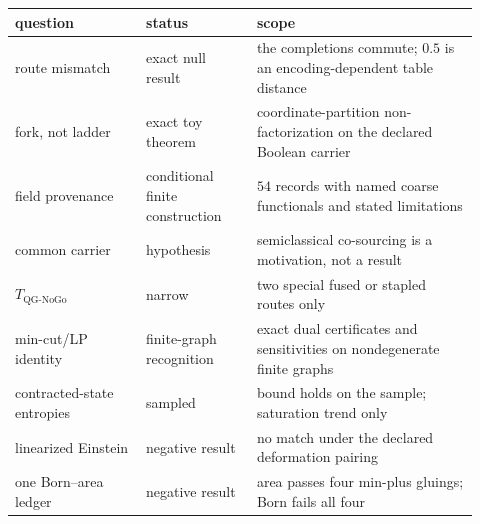 \begin{center}
\small
\begin{longtable}[]{@{}p{0.26\linewidth}p{0.22\linewidth}p{0.44\linewidth}@{}}
\toprule
question & status & scope\\
\midrule
\endhead
route mismatch & exact null result & the completions commute; \(0.5\) is an encoding-dependent table distance\\
fork, not ladder & exact toy theorem & coordinate-partition non-factorization on the declared Boolean carrier\\
field provenance & conditional finite construction & \(54\) records with named coarse functionals and stated
limitations\\
common carrier & hypothesis & semiclassical co-sourcing is a motivation, not a result\\
\(T_{\mathrm{QG\text{-}NoGo}}\) & narrow & two special fused or stapled routes only\\
min-cut/LP identity & finite-graph recognition & exact dual certificates and sensitivities on nondegenerate finite
graphs\\
contracted-state entropies & sampled & bound holds on the sample; saturation trend only\\
linearized Einstein & negative result & no match under the declared deformation pairing\\
one Born--area ledger & negative result & area passes four min-plus gluings; Born fails all four\\
\bottomrule
\end{longtable}
\end{center}
